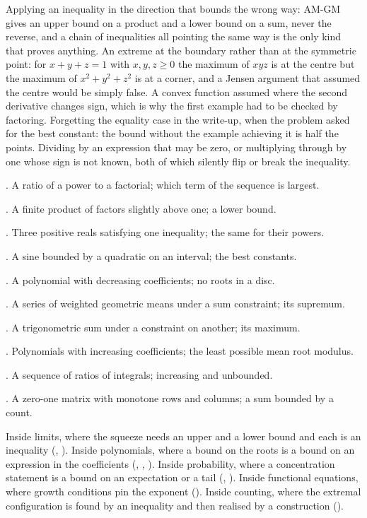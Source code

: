 \begin{trap}
Applying an inequality in the direction that bounds the wrong way: AM-GM gives an upper bound on a product and a lower bound on a sum, never the reverse, and a chain of inequalities all pointing the same way is the only kind that proves anything. An extreme at the boundary rather than at the symmetric point: for $x+y+z=1$ with $x,y,z\ge 0$ the maximum of $xyz$ is at the centre but the maximum of $x^2+y^2+z^2$ is at a corner, and a Jensen argument that assumed the centre would be simply false. A convex function assumed where the second derivative changes sign, which is why the first example had to be checked by factoring. Forgetting the equality case in the write-up, when the problem asked for the best constant: the bound without the example achieving it is half the points. Dividing by an expression that may be zero, or multiplying through by one whose sign is not known, both of which silently flip or break the inequality.
\end{trap}

\begin{ladder}
\item {}. A ratio of a power to a factorial; which term of the sequence is largest.
\item {}. A finite product of factors slightly above one; a lower bound.
\item {}. Three positive reals satisfying one inequality; the same for their powers.
\item {}. A sine bounded by a quadratic on an interval; the best constants.
\item {}. A polynomial with decreasing coefficients; no roots in a disc.
\item {}. A series of weighted geometric means under a sum constraint; its supremum.
\item {}. A trigonometric sum under a constraint on another; its maximum.
\item {}. Polynomials with increasing coefficients; the least possible mean root modulus.
\item {}. A sequence of ratios of integrals; increasing and unbounded.
\item {}. A zero-one matrix with monotone rows and columns; a sum bounded by a count.
\end{ladder}

\begin{hides}
Inside limits, where the squeeze needs an upper and a lower bound and each is an inequality (, ). Inside polynomials, where a bound on the roots is a bound on an expression in the coefficients (, , ). Inside probability, where a concentration statement is a bound on an expectation or a tail (, ). Inside functional equations, where growth conditions pin the exponent (). Inside counting, where the extremal configuration is found by an inequality and then realised by a construction ().
\end{hides}
